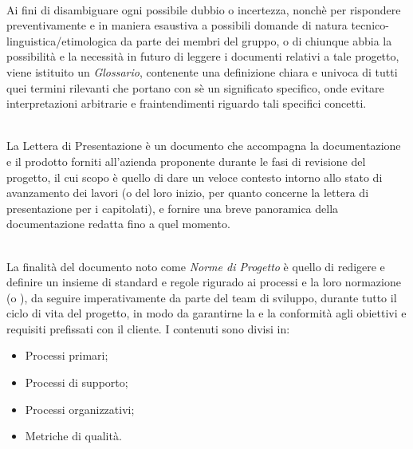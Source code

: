 \\
Ai fini di disambiguare ogni possibile dubbio o incertezza, nonchè per rispondere preventivamente e
in maniera esaustiva a possibili domande di natura tecnico-linguistica/etimologica da parte dei
membri del gruppo, o di chiunque abbia la possibilità e la necessità in futuro di leggere i
documenti relativi a tale progetto, viene istituito un \textit{Glossario}, contenente una definizione chiara e univoca di tutti quei termini rilevanti che portano con sè un significato specifico, onde evitare interpretazioni arbitrarie e fraintendimenti riguardo tali specifici concetti.

\\
La Lettera di Presentazione è un documento che accompagna la documentazione e il prodotto forniti all'azienda proponente durante le fasi di revisione del progetto, il cui scopo è quello di dare un veloce contesto intorno allo stato di avanzamento dei lavori (o del loro inizio, per quanto concerne la lettera di presentazione per i capitolati), e fornire una breve panoramica della documentazione redatta fino a quel momento. 

\\
La finalità del documento noto come \textit{Norme di Progetto }è quello di redigere e definire un insieme di standard e regole rigurado ai processi e la loro normazione (o ), da seguire imperativamente da parte del team di sviluppo, durante tutto il ciclo di vita del progetto, in modo da garantirne la  e la conformità agli obiettivi e requisiti prefissati con il cliente. I contenuti sono divisi in:
\begin{itemize}
    \item Processi primari;
    \item Processi di supporto;
    \item Processi organizzativi;
    \item Metriche di qualità.
\end{itemize}

